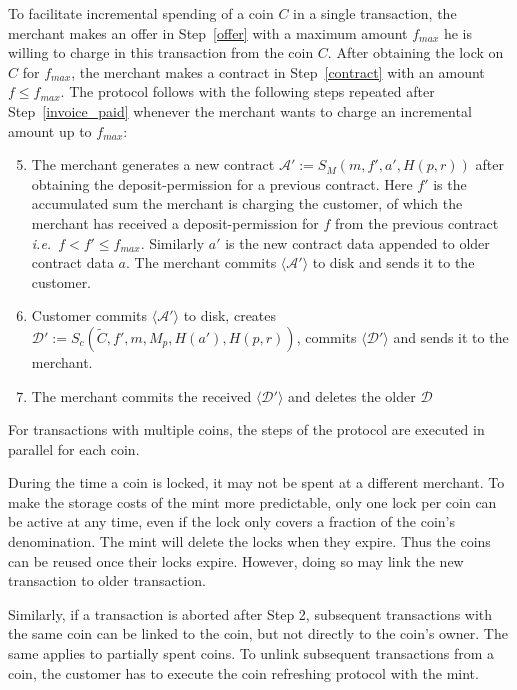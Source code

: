 \documentclass{llncs}
\begin{document}
To facilitate incremental spending of a coin $C$ in a single transaction, the
merchant makes an offer in Step~\ref{offer} with a maximum amount $f_{max}$ he
is willing to charge in this transaction from the coin $C$.  After obtaining the
lock on $C$ for $f_{max}$, the merchant makes a contract in Step~\ref{contract}
with an amount $f \leq f_{max}$.  The protocol follows with the following steps
repeated after Step~\ref{invoice_paid} whenever the merchant wants to charge an
incremental amount up to $f_{max}$:

\begin{enumerate}
  \setcounter{enumi}{4}
\item The merchant generates a new contract $ \mathcal{A}' := S_M(m, f', a', H(p,
  r)) $ after obtaining the deposit-permission for a previous contract.  Here
  $f'$ is the accumulated sum the merchant is charging the customer, of which
  the merchant has received a deposit-permission for $f$ from the previous
  contract \textit{i.e.}~$f <f' \leq f_{max}$.  Similarly $a'$ is the new
  contract data appended to older contract data $a$.
  The merchant commits $\langle \mathcal{A}' \rangle$ to disk and sends it to the customer.
\item Customer commits $\langle \mathcal{A}' \rangle$ to disk, creates
  $\mathcal{D}' := S_c(\widetilde{C}, f', m, M_p, H(a'), H(p, r))$, commits
  $\langle \mathcal{D'} \rangle$ and sends it to the merchant.
\item The merchant commits the received $\langle \mathcal{D'} \rangle$ and
  deletes the older $\mathcal{D}$
\end{enumerate}


For transactions with multiple coins, the steps of the protocol are executed in
parallel for each coin.

During the time a coin is locked, it may not be spent at a
different merchant.  To make the storage costs of the mint more predictable,
only one lock per coin can be active at any time, even if the lock only covers a
fraction of the coin's denomination.  The mint will delete the locks when they
expire.  Thus the coins can be reused once their locks expire.  However, doing
so may link the new transaction to older transaction.

Similarly, if a transaction is aborted after Step 2, subsequent transactions
with the same coin can be linked to the coin, but not directly to the coin's
owner.  The same applies to partially spent coins.  To unlink subsequent
transactions from a coin, the customer has to execute the coin refreshing
protocol with the mint.
\end{document}
